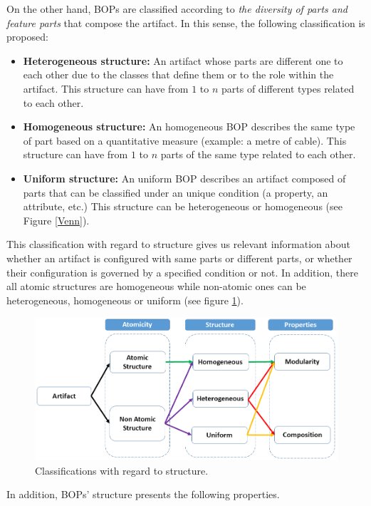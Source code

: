\documentclass[runningheads,a4paper]{llncs}
\begin{document}
On the other hand, BOPs are classified according to \emph{the diversity of parts and feature  parts} that compose the artifact. In this sense, the following classification is proposed:
\begin{itemize}
   \item \textbf{Heterogeneous structure:} An artifact whose parts are different one to each other due to the classes that define them or to the role within the artifact.
  This structure can have from $1$ to $n$ parts of different types related to each other.
   \item \textbf{Homogeneous structure:} An homogeneous BOP describes the same type of part based on a quantitative measure (example: a metre of cable). This structure can have from $1$ to $n$ parts of the same type related to each other.
  \item \textbf{Uniform structure:} An uniform BOP describes an artifact composed of parts that can be classified under an unique condition (a property, an attribute, etc.) This structure can be heterogeneous or homogeneous (see Figure \ref{Venn}).   
\end{itemize}

This classification with regard to structure gives us relevant information about whether an artifact is configured with same parts or different parts, or whether their configuration is governed by a specified condition or not. In addition, there all atomic structures are homogeneous while non-atomic ones can be heterogeneous, homogeneous or uniform (see figure \ref{CS}). 

\begin{figure}[H]
\centering
\includegraphics[scale=0.4]{SC2.png}
\caption{Classifications with regard to structure.}\label{CS}
\end{figure}

In addition, BOPs' structure presents the following properties.
\end{document}
